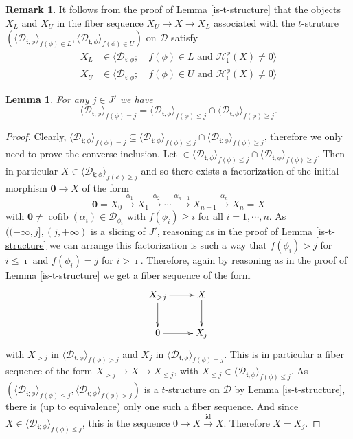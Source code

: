\documentclass{article}
\newtheorem{lem}[thm]{Lemma}
\theoremstyle{definition}
\newtheorem{rem}[thm]{Remark}
\newcommand{\tee}{\mathfrak{t}}
\DeclareMathOperator{\cofib}{cofib}
\begin{document}
\begin{rem}\label{a-closer-look}
It follows from the proof of Lemma \ref{is-t-structure} that the objects $X_L$ and $X_U$ in the fiber sequence $X_U\to X\to X_L$ associated with the $t$-struture $(\langle \mathscr{D}_{\tee;\phi}\rangle_{f(\phi)\in L},\langle \mathscr{D}_{\tee;\phi}\rangle_{f(\phi)\in U})$ on $\mathscr{D}$ satisfy
\begin{align*}
X_L&\in \langle \mathscr{D}_{\tee;\phi};\quad f(\phi)\in L \text{ and }\mathcal{H}^\phi_\tee(X)\neq 0\rangle\\
X_U&\in \langle \mathscr{D}_{\tee;\phi};\quad f(\phi)\in U \text{ and }\mathcal{H}^\phi_\tee(X)\neq 0\rangle
\end{align*}
\end{rem}

\begin{lem}\label{slices}
For any $j\in J'$ we have
\[
\langle \mathscr{D}_{\tee;\phi}\rangle_{f(\phi)=j}=\langle \mathscr{D}_{\tee;\phi}\rangle_{f(\phi)\leq j}\cap \langle \mathscr{D}_{\tee;\phi}\rangle_{f(\phi)\geq j}.
\]
\end{lem}
\begin{proof}
Clearly, $\langle \mathscr{D}_{\tee;\phi}\rangle_{f(\phi)=j}\subseteq \langle \mathscr{D}_{\tee;\phi}\rangle_{f(\phi)\leq j}\cap \langle \mathscr{D}_{\tee;\phi}\rangle_{f(\phi)\geq j}$, therefore we only need to prove the converse inclusion. Let $\in \langle \mathscr{D}_{\tee;\phi}\rangle_{f(\phi)\leq j}\cap \langle \mathscr{D}_{\tee;\phi}\rangle_{f(\phi)\geq j}$. Then in particular 
$X\in \langle \mathscr{D}_{\tee;\phi}\rangle_{f(\phi)\geq j}$
and so there exists a factorization of the initial morphism $\mathbf{0} \to X$ of the form
\[
\mathbf{0}=X_0 \xrightarrow{\alpha_1} X_1\xrightarrow{\alpha_2}\cdots \xrightarrow{\alpha_{n-1}}X_{n-1}\xrightarrow{\alpha_n} X_n=X
\]
with $\mathbf{0} \neq \cofib(\alpha_i) \in \mathscr{D}_{\phi_i}$ with $f(\phi_i)\geq i$ for all $i = 1, \cdots, n$. As $((-\infty,j],(j,+\infty)$ is a slicing of $J'$, reasoning as in the proof of Lemma \ref{is-t-structure} we can arrange this factorization is such a way that $f(\phi_i)>j$ for $i\leq \bar{\imath}$ and $f(\phi_i)= j$ for $i>\bar{\imath}$. Therefore, again by reasoning as in the proof of Lemma \ref{is-t-structure} we get a fiber sequence of the form
\[
\xymatrix{
X_{>j}\ar[r]\ar[d] & X\ar[d]\\
0\ar[r]&X_{j}
}
\]
with $X_{>j}$ in $\langle \mathscr{D}_{\tee;\phi}\rangle_{f(\phi)>j}$ and $X_j$ in $\langle \mathscr{D}_{\tee;\phi}\rangle_{f(\phi)=j}$. This is in particular a fiber sequence of the form $X_{>j}\to X\to X_{\leq j}$, with $X_{\leq j}\in \langle \mathscr{D}_{\tee;\phi}\rangle_{f(\phi)\leq j}$. 
As $(\langle \mathscr{D}_{\tee;\phi}\rangle_{f(\phi)\leq j},\langle \mathscr{D}_{\tee;\phi}\rangle_{f(\phi)> j})$ is a $t$-structure on $\mathscr{D}$ by Lemma \ref{is-t-structure}, there is (up to equivalence) only one such a fiber sequence. And since $X\in \langle \mathscr{D}_{\tee;\phi}\rangle_{f(\phi)\leq j}$, this is the sequence $0\to X\xrightarrow{\mathrm{id}} X$. Therefore $X=X_j$.
\end{proof}
\end{document}
